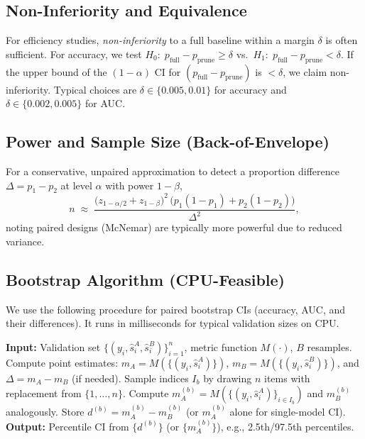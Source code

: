 \documentclass{article}
\begin{document}
\subsection{Non-Inferiority and Equivalence}
For efficiency studies, \emph{non-inferiority} to a full baseline within a margin $\delta$ is often sufficient. For accuracy, we test $H_0:\;p_{\text{full}}-p_{\text{prune}}\ge \delta$ vs.\ $H_1:\;p_{\text{full}}-p_{\text{prune}}<\delta$. If the upper bound of the $(1-\alpha)$ CI for $(p_{\text{full}}-p_{\text{prune}})$ is $<\delta$, we claim non-inferiority. Typical choices are $\delta\in\{0.005,0.01\}$ for accuracy and $\delta\in\{0.002,0.005\}$ for AUC.

\subsection{Power and Sample Size (Back-of-Envelope)}
For a conservative, unpaired approximation to detect a proportion difference $\Delta=p_1-p_2$ at level $\alpha$ with power $1-\beta$,
\begin{equation}
\label{eq:ssize}
n \;\approx\; \frac{\big(z_{1-\alpha/2}+z_{1-\beta}\big)^2 \,\big(p_1(1-p_1)+p_2(1-p_2)\big)}{\Delta^2},
\end{equation}
noting paired designs (McNemar) are typically more powerful due to reduced variance.

\subsection{Bootstrap Algorithm (CPU-Feasible)}
We use the following procedure for paired bootstrap CIs (accuracy, AUC, and their differences). It runs in milliseconds for typical validation sizes on CPU.
\begin{algorithm}[H]
\caption{Paired Bootstrap CI for Metric or Metric Difference}
\label{alg:bootstrap}
\begin{algorithmic}[1]
\STATE \textbf{Input:} Validation set $\{(y_i,\hat{s}^{A}_i,\hat{s}^{B}_i)\}_{i=1}^{n}$, metric function $M(\cdot)$, $B$ resamples.
\STATE Compute point estimates: $m_A = M(\{(y_i,\hat{s}^{A}_i)\})$, $m_B = M(\{(y_i,\hat{s}^{B}_i)\})$, and $\Delta=m_A-m_B$ (if needed).
  \STATE Sample indices $I_b$ by drawing $n$ items with replacement from $\{1,\dots,n\}$.
  \STATE Compute $m_A^{(b)} = M(\{(y_i,\hat{s}^{A}_i)\}_{i\in I_b})$ and $m_B^{(b)}$ analogously.
  \STATE Store $d^{(b)} = m_A^{(b)} - m_B^{(b)}$ (or $m_A^{(b)}$ alone for single-model CI).
\ENDFOR
\STATE \textbf{Output:} Percentile CI from $\{d^{(b)}\}$ (or $\{m_A^{(b)}\}$), e.g., 2.5th/97.5th percentiles.
\end{algorithmic}
\end{algorithm}
\end{document}

